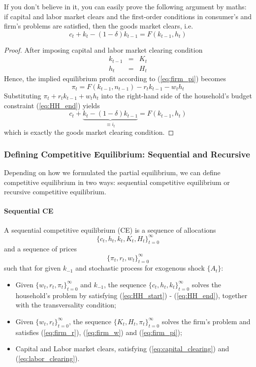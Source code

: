 \documentclass[12pt]{article}
\begin{document}
If you don't believe in it, you can easily prove the following argument by maths: if capital and labor market clears and the first-order conditions in consumer's and firm's problems are satisfied, then the goods market clears, i.e.
\[c_t + k_t - (1-\delta) k_{t-1} = F(k_{t-1}, h_t)\]

\begin{proof}
After imposing capital and labor market clearing condition
\begin{eqnarray}
	k_{t-1} &=& K_t \label{eq:capital_clearing} \\
	h_t &=& H_t \label{eq:labor_clearing}
\end{eqnarray}
Hence, the implied equilibrium profit according to (\ref{eq:firm_pi}) becomes
\[\pi_t = F(k_{t-1},n_{t-1}) - r_t k_{t-1} - w_t h_t \]
Substituting $\pi_t + r_t k_{t-1} + w_t h_t$ into the right-hand side of the household's budget constraint (\ref{eq:HH_end}) yields
\begin{equation*}
	c_t + \underbrace{k_t - (1-\delta) k_{t-1}}_{\equiv i_t} = F(k_{t-1}, h_t) 
\end{equation*}
which is exactly the goods market clearing condition.

\end{proof}

\subsubsection{Defining Competitive Equilibrium: Sequential and Recursive}

Depending on how we formulated the partial equilibrium, we can define competitive equilibrium in two ways: sequential competitive equilibrium or recursive competitive equilibrium.

\paragraph{Sequential CE \\ [6pt]}
	A sequential competitive equilibrium (CE) is a sequence of allocations $$\{c_t, h_t, k_t, K_t, H_t\}_{t=0}^\infty$$ and a sequence of prices
	\[\{\pi_t, r_t, w_t\}_{t=0}^\infty\]
	such that for given $k_{-1}$ and stochastic process for exogenous shock $\{A_t\}$:
	\begin{itemize}
		\item Given $\{w_t, r_t, \pi_t\}_{t=0}^\infty$ and $k_{-1}$, the sequence $\{c_t, h_t, k_t\}_{t=0}^\infty$ solves the household's problem by satisfying (\ref{eq:HH_start}) - (\ref{eq:HH_end}), together with the transversality condition;
		\item Given $\{w_t, r_t\}_{t=0}^\infty$, the sequence $\{K_t, H_t, \pi_t\}_{t=0}^\infty$ solves the firm's problem and satisfies (\ref{eq:firm_r}), (\ref{eq:firm_w}) and (\ref{eq:firm_pi});
		\item Capital and Labor market clears, satisfying (\ref{eq:capital_clearing}) and (\ref{eq:labor_clearing}).
	\end{itemize}
\end{document}
